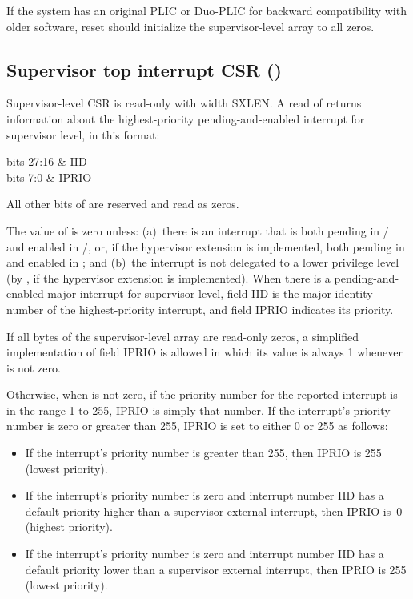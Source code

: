 If the system has an original PLIC or \mbox{Duo-PLIC} for backward
compatibility with older software, reset should initialize the
supervisor-level  array to all zeros.

\subsection{Supervisor top interrupt CSR ()}
\label{sec:stopi}

Supervisor-level CSR  is read-only with width SXLEN.
A read of  returns information about the highest-priority
pending-and-enabled interrupt for supervisor level, in this
format:\nopagebreak
\begin{displayLinesTable}[l@{\quad}l]
bits 27:16 & IID \\
bits 7:0   & IPRIO \\
\end{displayLinesTable}
All other bits of  are reserved and read as zeros.

The value of  is zero unless:
(a)~there is an interrupt that is both pending in /
and enabled in /, or, if the hypervisor extension is
implemented, both pending in  and enabled in ; and
(b)~the interrupt is not delegated to a lower privilege level
(by , if the hypervisor extension is implemented).
When there is a pending-and-enabled major interrupt for supervisor
level, field IID is the major identity number of the highest-priority
interrupt, and field IPRIO indicates its priority.

If all bytes of the supervisor-level  array are read-only
zeros, a simplified implementation of field IPRIO is allowed in which
its value is always 1 whenever  is not zero.

Otherwise, when  is not zero, if the priority number for the reported
interrupt is in the range 1 to 255, IPRIO is simply that number.
If the interrupt's priority number is zero or greater than 255,
IPRIO is set to either 0 or 255 as follows:
\begin{itemize}

\item
If the interrupt's priority number is greater than 255, then
IPRIO is 255 (lowest priority).

\item
If the interrupt's priority number is zero and interrupt number IID has
a default priority higher than a supervisor external interrupt, then
IPRIO is~0 (highest priority).

\item
If the interrupt's priority number is zero and interrupt number IID
has a default priority lower than a supervisor external interrupt, then
IPRIO is 255 (lowest priority).

\end{itemize}

